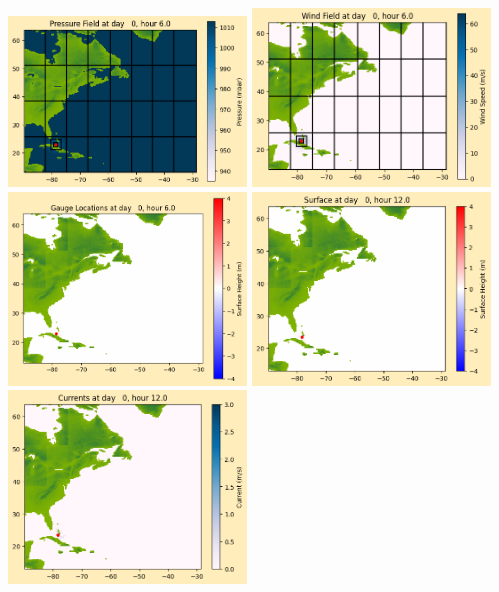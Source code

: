 \documentclass[11pt]{article}
\begin{document}
\includegraphics[width=0.475\textwidth]{frame0013fig1012.png}
\vskip 10pt 
\includegraphics[width=0.475\textwidth]{frame0013fig1013.png}
\includegraphics[width=0.475\textwidth]{frame0013fig1014.png}
\vskip 10pt 
\includegraphics[width=0.475\textwidth]{frame0014fig1001.png}
\includegraphics[width=0.475\textwidth]{frame0014fig1002.png}
\end{document}

